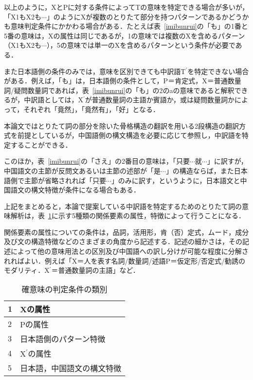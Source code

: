 以上のように，XとPに対する条件によってTの意味を特定できる場合が多いが，「X1もX2も$\cdots$」のようにXが複数のとりたて部分を持つパターンであるかどうかも意味判定条件にかかわる場合がある．たとえば表~\ref{imibunrui}の「も」の1番と5番の意味は，Xの属性は同じであるが，1の意味では複数のXを含めるパターン（X1もX2も$\cdots$），5の意味では単一のXを含めるパターンという条件が必要である．

また日本語側の条件のみでは，意味を区別できても中訳語T$^{\prime}$を特定できない場合がある．例えば，「も」は，日本語側の条件として，P＝肯定式，X＝普通数量詞/疑問数量詞であれば，表~\ref{imibunrui}の「も」の2のaの意味であると解釈できるが，中訳語としては，X$^{\prime}$が普通数量詞の主語か賓語か，或は疑問数量詞かによって，それぞれ「竟然」，「竟然有」，「好」となる．

本論文ではとりたて詞の部分を除いた骨格構造の翻訳を用いる2段構造の翻訳方式を前提としているが，中国語側の構文構造を必要に応じて参照し，中訳語を特定することができる．

このほか，表~\ref{imibunrui}の「さえ」の2番目の意味は，「只要$\cdots$就$\cdots$」に訳すが，中国語文の主節が反問文あるいは主節の述部が「是$\cdots$」の構造ならば，また日本語側で主節が省略されれば「只要$\cdots$」のみに訳す，というように，日本語文と中国語文の構文特徴が条件になる場合もある．

上記をまとめると，本論で提案している中訳語を特定するためのとりたて詞の意味解析は，表~\ref{ruibetsu}に示す5種類の関係要素の属性，特徴によって行うことになる．

関係要素の属性についての条件は，品詞，活用形，肯（否）定式，ムード，成分及び文の構造特徴などのさまざまの角度から記述する．記述の細かさは，その記述によって他の意味用法との区別及び中国語への訳し分けが可能な程度に分解されればよい．例えば「X＝人を表す名詞/数量詞/述語\hspace{1zw}P＝仮定形/否定式/勧誘のモダリティ．X$^{\prime}$＝普通数量詞の主語」など．

\begin{table}[htbp]
\begin{center}
\caption{確意味の判定条件の類別}
\label{ruibetsu}
 \begin{tabular}{|l|l|} \hline
  1 & Xの属性 \\ \hline
  2 & Pの属性 \\ \hline
  3 & 日本語側のパターン特徴 \\ \hline
  4 & X$^{\prime}$の属性 \\ \hline
  5 & 日本語，中国語文の構文特徴 \\ \hline
 \end{tabular}
\end{center}
\end{table}

